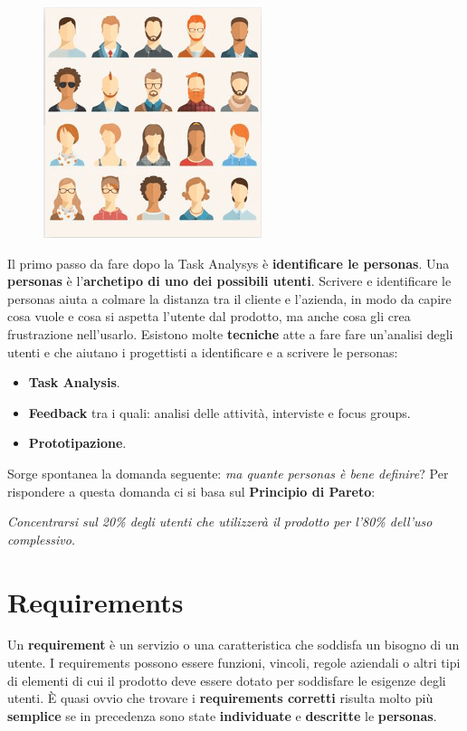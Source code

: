 \documentclass[a4paper,11pt,oneside]{book}
\begin{document}
\begin{figure}[!h]
	\centering
	\includegraphics[scale=0.55]{immagini/Personas.png}
\end{figure}

Il primo passo da fare dopo la Task Analysys è \textbf{identificare le personas}.
Una \textbf{personas} è l'\textbf{archetipo di uno dei possibili utenti}. Scrivere e
identificare le personas aiuta a colmare la distanza tra il cliente e l'azienda, in modo da capire cosa vuole e cosa si aspetta l'utente dal prodotto, ma anche cosa gli crea frustrazione nell'usarlo. Esistono molte \textbf{tecniche} atte a fare fare un'analisi degli utenti e che aiutano i progettisti a identificare e a scrivere le personas:

\begin{itemize}
	\item \textbf{Task Analysis}.
	\item \textbf{Feedback} tra i quali: analisi delle attività, interviste e focus groups.
	\item \textbf{Prototipazione}.
\end{itemize}

Sorge spontanea la domanda seguente: \textit{ma quante personas è bene definire}?
Per rispondere a questa domanda ci si basa sul \textbf{Principio di Pareto}: \begin{center}
	\textit{Concentrarsi sul 20\% degli utenti che utilizzerà il prodotto per l'80\% dell'uso complessivo.}
\end{center}

\pagebreak

\section{Requirements}

Un \textbf{requirement} è un servizio o una caratteristica che soddisfa un bisogno di un utente.
I requirements possono essere funzioni, vincoli, regole aziendali o altri tipi di elementi di cui il prodotto deve essere dotato per soddisfare le esigenze degli utenti. È quasi ovvio che trovare i \textbf{requirements corretti} risulta molto più \textbf{semplice} se in precedenza sono state \textbf{individuate} e \textbf{descritte} le \textbf{personas}.
\end{document}
